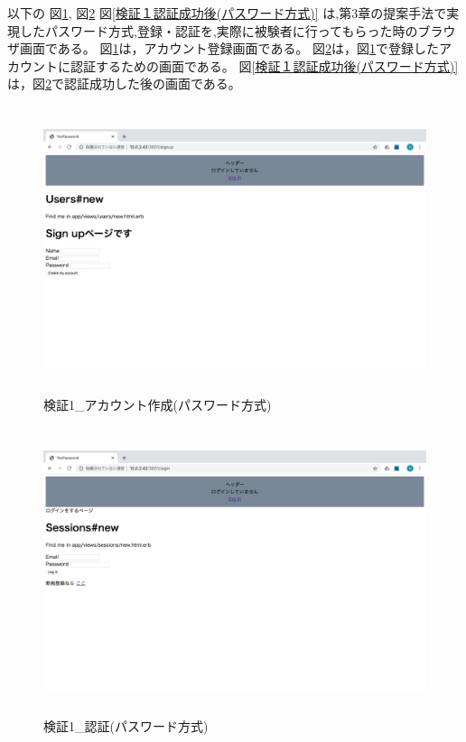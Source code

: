     以下の
    図\ref{検証１アカウント作成(パスワード方式)},
    図\ref{検証１認証(パスワード方式)}
    図\ref{検証１認証成功後(パスワード方式)}
    は,第3章の提案手法で実現したパスワード方式,登録・認証を,実際に被験者に行ってもらった時のブラウザ画面である。
    図\ref{検証１アカウント作成(パスワード方式)}は，アカウント登録画面である。
    図\ref{検証１認証(パスワード方式)}は，図\ref{検証１アカウント作成(パスワード方式)}で登録したアカウントに認証するための画面である。
    図\ref{検証１認証成功後(パスワード方式)}は，図\ref{検証１認証(パスワード方式)}で認証成功した後の画面である。
    \vspace{4cm}%
    \begin{figure}[H]
        \includegraphics[height=8.4cm]{./fig/chapter4/inspect_1/password_screnn/sign_up.png}
        \caption{検証1\_アカウント作成(パスワード方式)}
        \label{検証１アカウント作成(パスワード方式)}
    \end{figure}

    \vspace{4cm}%
    \begin{figure}[H]
        \includegraphics[height=8.4cm]{./fig/chapter4/inspect_1/password_screnn/login.png}
        \caption{検証1\_認証(パスワード方式)}
        \label{検証１認証(パスワード方式)}
    \end{figure}

